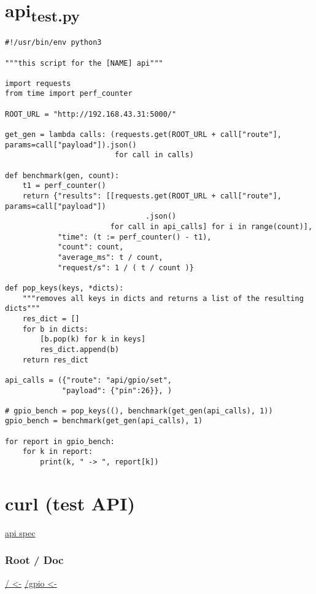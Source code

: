 \documentclass[11pt]{article}
\begin{document}
\section{api\textsubscript{test.py}}
\label{sec:org91da3da}
\begin{verbatim}
#!/usr/bin/env python3

"""this script for the [NAME] api"""

import requests
from time import perf_counter

ROOT_URL = "http://192.168.43.31:5000/"

get_gen = lambda calls: (requests.get(ROOT_URL + call["route"], params=call["payload"]).json()
                         for call in calls)

def benchmark(gen, count):
    t1 = perf_counter()
    return {"results": [[requests.get(ROOT_URL + call["route"], params=call["payload"])
                                .json()
                        for call in api_calls] for i in range(count)],
            "time": (t := perf_counter() - t1),
            "count": count,
            "average_ms": t / count,
            "request/s": 1 / ( t / count )}

def pop_keys(keys, *dicts):
    """removes all keys in dicts and returns a list of the resulting dicts"""
    res_dict = []
    for b in dicts:
        [b.pop(k) for k in keys]
        res_dict.append(b)
    return res_dict

api_calls = ({"route": "api/gpio/set",
             "payload": {"pin":26}}, )

# gpio_bench = pop_keys((), benchmark(get_gen(api_calls), 1))
gpio_bench = benchmark(get_gen(api_calls), 1)

for report in gpio_bench:
    for k in report:
        print(k, " -> ", report[k])

\end{verbatim}

\section{curl (test API)}
\label{sec:org4775819}
\hyperref[sec:org9007b89]{api spec}
\subsubsection{Root / Doc}
\label{sec:orgf9f8c06}
\href{curl 192.168.43.31:5000/ \&}{/  <-}
\href{curl -G -d "pin=2" 192.168.43.31:5000/api/gpio \&}{/gpio <-}
\end{document}
